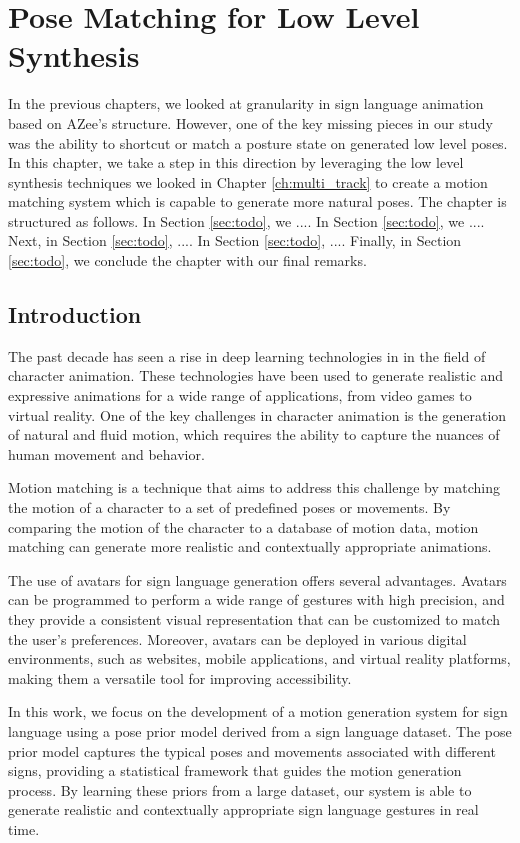 \documentclass[../../main.tex]{subfiles}
\begin{document}
\chapter{Pose Matching for Low Level Synthesis}
\label{ch:pose_matching}

In the previous chapters, we looked at granularity in sign language animation based on AZee's structure. However, one of the key missing pieces in our study was the ability to shortcut or match a posture state on generated low level poses. In this chapter, we take a step in this direction by leveraging the low level synthesis techniques we looked in Chapter \ref{ch:multi_track} to create a motion matching system which is capable to generate more natural poses.
The chapter is structured as follows. In Section \ref{sec:todo}, we .... In Section \ref{sec:todo}, we .... Next, in Section \ref{sec:todo}, .... In Section \ref{sec:todo}, .... Finally, in Section \ref{sec:todo}, we conclude the chapter with our final remarks.

\section{Introduction}

The past decade has seen a rise in deep learning technologies in in the field of character animation. These technologies have been used to generate realistic and expressive animations for a wide range of applications, from video games to virtual reality. One of the key challenges in character animation is the generation of natural and fluid motion, which requires the ability to capture the nuances of human movement and behavior. 

Motion matching is a technique that aims to address this challenge by matching the motion of a character to a set of predefined poses or movements. By comparing the motion of the character to a database of motion data, motion matching can generate more realistic and contextually appropriate animations.

The use of avatars for sign language generation offers several advantages. Avatars can be programmed to perform a wide range of gestures with high precision, and they provide a consistent visual representation that can be customized to match the user's preferences. Moreover, avatars can be deployed in various digital environments, such as websites, mobile applications, and virtual reality platforms, making them a versatile tool for improving accessibility.

In this work, we focus on the development of a motion generation system for sign language using a pose prior model derived from a sign language dataset. The pose prior model captures the typical poses and movements associated with different signs, providing a statistical framework that guides the motion generation process. By learning these priors from a large dataset, our system is able to generate realistic and contextually appropriate sign language gestures in real time.
\end{document}
